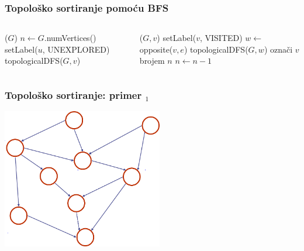 \documentclass[compress,aspectratio=169]{beamer}
\begin{document}
\begin{frame}[fragile]
  \frametitle{Topološko sortiranje pomoću BFS}
  {\small
  \begin{columns}
    \begin{column}[t]{6cm}
      \begin{algorithmic}
        \STATE {}($G$)
        \STATE $n \leftarrow G$.numVertices()
          \STATE setLabel($u$, {\scriptsize UNEXPLORED})
        \ENDFOR
            \STATE topologicalDFS($G,v$)
          \ENDIF
        \ENDFOR
      \end{algorithmic}
    \end{column}
    \begin{column}[t]{6cm}
      \begin{algorithmic}
        \STATE {}($G,v$)
        \STATE setLabel($v$, {\scriptsize VISITED})
          \STATE $w \leftarrow$ opposite($v,e$)
            \STATE {}
            \STATE topologicalDFS($G,w$) 
          \ELSE
            \STATE {}
            \STATE označi $v$ brojem $n$ 
          \ENDIF
        \ENDFOR{}
        \STATE $n \leftarrow n-1$
      \end{algorithmic}
    \end{column}
  \end{columns}
  }
\end{frame}

\begin{frame}[fragile]
  \frametitle{Topološko sortiranje: primer $_1$}
  \begin{center}
    \includegraphics[width=7cm]{asp-14-pic48.png}
  \end{center}
\end{frame}
\end{document}
